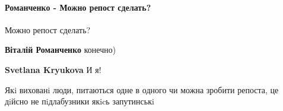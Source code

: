  
 
 
 
 
\paragraph{Романченко - Можно репост сделать?}
\label{sec:14_07_2021.fb.krjukova_svetlana.1.statja_putina_mnenie.cmt.romanchenko_repost}

\begin{itemize}
 
Можно репост сделать?

\begin{itemize}

 
\textbf{Віталій Романченко} конечно)

 
\textbf{Svetlana Kryukova} И я!

 
Якi вихованi люди, питаються одне в одного чи можна зробити репоста, це дiйсно не пiдлабузники якicь запутинськi

 

\end{itemize}
\end{itemize}

